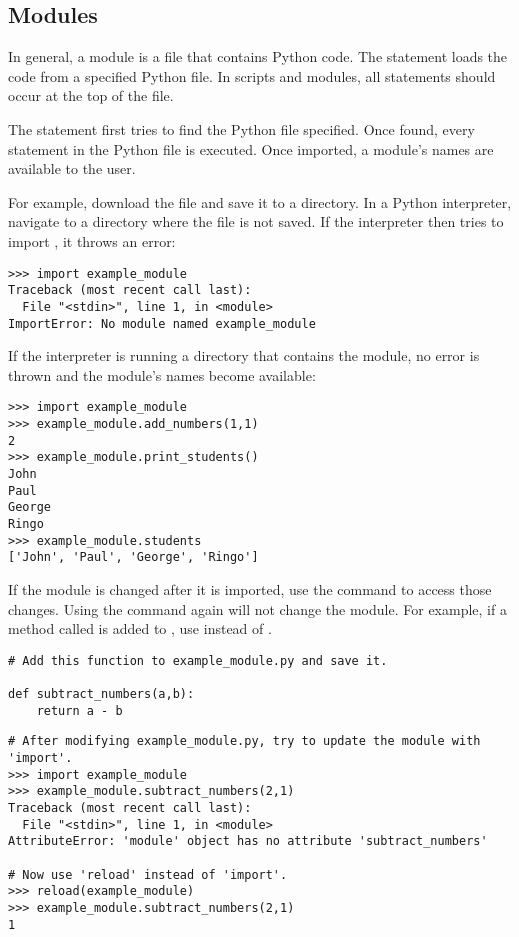 \subsection*{Modules}

In general, a module is a file that contains Python code.
The  statement loads the code from a specified Python file.
In scripts and modules, all  statements should occur at the top of the file.

The  statement first tries to find the Python file specified.
Once found, every statement in the Python file is executed.
Once imported, a module's names are available to the user.

For example, download the file  and save it to a directory.
In a Python interpreter, navigate to a directory where the file is not saved.
If the interpreter then tries to import , it throws an error:

\begin{lstlisting}
>>> import example_module
Traceback (most recent call last):
  File "<stdin>", line 1, in <module>
ImportError: No module named example_module
\end{lstlisting}

If the interpreter is running a directory that contains the module, no error is thrown and the module's names become available:

\begin{lstlisting}
>>> import example_module
>>> example_module.add_numbers(1,1)
2
>>> example_module.print_students()
John
Paul
George
Ringo
>>> example_module.students
['John', 'Paul', 'George', 'Ringo']
\end{lstlisting}

If the module is changed after it is imported, use the  command to access those changes.
Using the  command again will not change the module.
For example, if a method called  is added to , use  instead of .

\begin{lstlisting}
# Add this function to example_module.py and save it.

def subtract_numbers(a,b):
    return a - b
\end{lstlisting}

\begin{lstlisting}
# After modifying example_module.py, try to update the module with 'import'.
>>> import example_module
>>> example_module.subtract_numbers(2,1)
Traceback (most recent call last):
  File "<stdin>", line 1, in <module>
AttributeError: 'module' object has no attribute 'subtract_numbers'

# Now use 'reload' instead of 'import'.
>>> reload(example_module)
>>> example_module.subtract_numbers(2,1)
1
\end{lstlisting}

